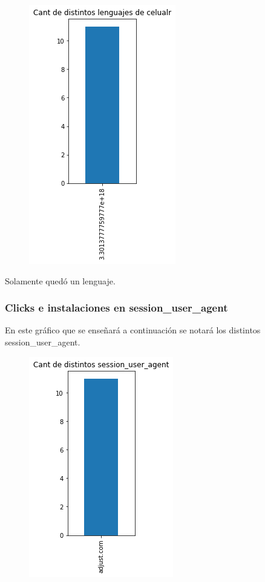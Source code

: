 \documentclass[a4paper, 12pt]{article}
\newcommand\tab[1][1cm]{\hspace*{#1}}
\begin{document}
{{	\FloatBarrier
		\begin{figure}[h]
			\centering
			\includegraphics[scale = 0.5]{images/clicks-installs/device_language.png}
			\caption{}
		\end{figure}
	\FloatBarrier

	\tab Solamente quedó un lenguaje.
	
	\subsubsection{Clicks e instalaciones en session\_user\_agent}
	\tab En este gráfico que se enseñará a continuación se notará los distintos session\_user\_agent.
	
	\FloatBarrier
		\begin{figure}[h]
			\centering
			\includegraphics[scale = 0.5]{images/clicks-installs/session_user_agent.png}
			\caption{}
		\end{figure}
	\FloatBarrier
	
}}
\end{document}
